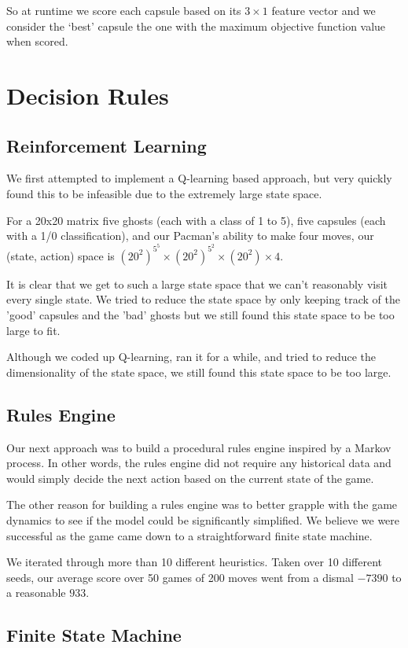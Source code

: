 \documentclass[11pt, oneside]{article}   	%
\begin{document}
So at runtime we score each capsule based on its $3\times1$ feature vector and we consider the `best' capsule the one with the maximum objective function value when scored.

\section{Decision Rules}

\subsection{Reinforcement Learning}
We first attempted to implement a Q-learning based approach, but very quickly found this to be infeasible due to the extremely large state space.

For a 20x20 matrix five ghosts (each with a class of 1 to 5), five capsules (each with a 1/0 classification), and our Pacman's ability to make four moves, our (state, action) space is $(20^2)^{5^5} \times (20^2)^{5^2} \times (20^2) \times 4$.

It is clear that we get to such a large state space that we can't reasonably visit every single state. We tried to reduce the state space by only keeping track of the 'good' capsules and the 'bad' ghosts but we still found this state space to be too large to fit. 

Although we coded up Q-learning, ran it for a while, and tried to reduce the dimensionality of the state space, we still found this state space to be too large.

\subsection{Rules Engine}
Our next approach was to build a procedural rules engine inspired by a Markov process. In other words, the rules engine did not require any historical data and would simply decide the next action based on the current state of the game.

The other reason for building a rules engine was to better grapple with the game dynamics to see if the model could be significantly simplified. We believe we were successful as the game came down to a straightforward finite state machine. 

We iterated through more than 10 different heuristics. Taken over 10 different seeds, our average score over 50 games of 200 moves went from a dismal $-7390$ to a reasonable $933$.

\subsection{Finite State Machine}
\end{document}
